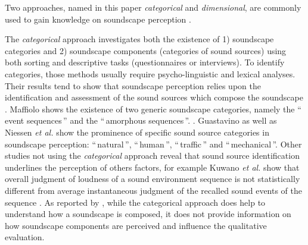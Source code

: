 \documentclass[twoside,twocolumn]{article}
\begin{document}
Two approaches, named in this paper \textit{categorical} and \textit{dimensional}, are commonly used to gain knowledge on soundscape perception .

The \textit{categorical} approach investigates both the existence of 1) soundscape categories and 2) soundscape components (categories of sound sources) using both sorting \cite{maffiolo_caracterisation_1999, guastavino_categorization_2007} and descriptive \cite{axelsson2005soundscape, raimbault_urban_2005, raimbault2006qualitative, guastavino_ideal_2006} tasks (questionnaires or interviews). To identify categories, those methods usually require psycho-linguistic and lexical analyses. Their results tend to show that soundscape perception relies upon the identification and assessment of the sound sources which compose the soundscape \cite{dubois2006cognitive}. Maffiolo \cite{maffiolo_caracterisation_1999} shows the existence of two generic soundscape categories, namely the ``\,event sequences\,'' and the ``\,amorphous sequences\,''. . Guastavino \cite{guastavino_categorization_2007} as well as Niessen \emph{et al.} \cite{niessen_categories_2010}  show the prominence of specific sound source categories in soundscape perception: ``\,natural\,'', ``\,human\,'', ``\,traffic\,'' and ``\,mechanical\,''. Other studies not using the \textit{categorical} approach reveal that sound source identification underlines the perception of others factors, for example Kuwano \emph{et al.} \cite{kuwano_memory_2003-1} show that overall judgment of loudness of a sound environment sequence is not statistically different from average instantaneous judgment of the recalled sound events of the sequence .  As reported by \cite{davies_perception_2013}, while the categorical approach does help to understand how a soundscape is composed, it does not provide information on how soundscape components are perceived and influence the qualitative evaluation.
\end{document}

